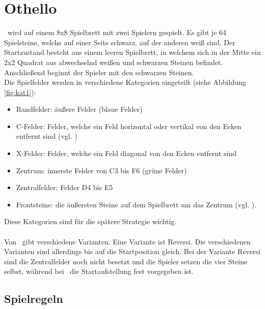 \chapter{Othello}
\label{othello-chapter}
\ot\ wird auf einem 8x8 Spielbrett mit zwei Spielern gespielt. Es gibt je 64 Spielsteine, welche auf einer Seite schwarz, auf der anderen weiß sind. Der Startzustand besteht aus einem leeren Spielbrett, in welchem sich in der Mitte ein 2x2 Quadrat aus abwechselnd weißen und schwarzen Steinen befindet. Anschließend beginnt der Spieler mit den schwarzen Steinen.
\\Die Spielfelder werden in verschiedene Kategorien eingeteilt (siehe Abbildung
 \ref{fig:kat1}):
\begin{itemize}
\item Randfelder: äußere Felder (blaue Felder) \cite{wikibooks}
\item C-Felder: Felder, welche ein Feld horizontal oder vertikal von den Ecken entfernt sind (vgl. \cite{Berg})
\item X-Felder: Felder, welche ein Feld diagonal von den Ecken entfernt sind \cite{wikibooks}
\item Zentrum: innerste Felder von C3 bis F6 (grüne Felder) \cite{wikibooks}
\item Zentralfelder: Felder D4 bis E5 \cite{wikibooks}
\item Frontsteine: die äußersten Steine auf dem Spielbrett um das Zentrum (vgl. \cite{Ortiz.}).
\end{itemize}
Diese Kategorien sind für die spätere Strategie wichtig.
\\
\\Von \ot\ gibt verschiedene Varianten. Eine Variante ist Reversi.
Die verschiedenen Varianten sind allerdings bis auf die Startposition gleich. Bei der Variante Reversi sind die Zentralfelder noch nicht besetzt und die Spieler setzen die vier Steine selbst, während bei \ot\ die Startaufstellung fest vorgegeben ist.

\section{Spielregeln}

